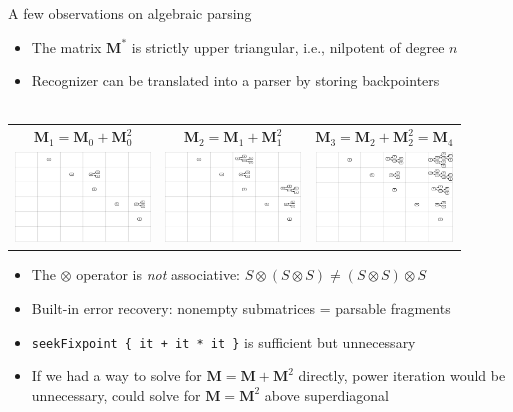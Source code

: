 \documentclass{beamer}
\begin{document}
\begin{frame}{A few observations on algebraic parsing}
  \begin{itemize}
    \item The matrix $\mathbf M^*$ is strictly upper triangular, i.e., nilpotent of degree $n$
    \item Recognizer can be translated into a parser by storing backpointers\\\\
  \end{itemize}\vspace{0.2cm}
  \begin{tabular}{ c c c }
    \small{$\mathbf{M}_1 = \mathbf{M}_0 + \mathbf{M}_0^2$} & \small{$\mathbf{M}_2 = \mathbf{M}_1 + \mathbf{M}_1^2$} & \small{$\mathbf{M}_3 = \mathbf{M}_2 + \mathbf{M}_2^2 = \mathbf{M}_4$} \\
    \includegraphics[trim=420 288 0 0,clip, width=3.6cm]{../figures/parse2.png} &
    \includegraphics[trim=420 285 0 0,clip, width=3.6cm]{../figures/parse3.png} &
    \includegraphics[trim=420 287 0 0,clip, width=3.63cm]{../figures/parse4.png}
  \end{tabular}
  \begin{itemize}
    \item The $\otimes$ operator is \textit{not} associative: $S \otimes (S \otimes S) \neq (S \otimes S) \otimes S$
    \item Built-in error recovery: nonempty submatrices = parsable fragments
    \item \texttt{seekFixpoint \{ it + it * it \}} is sufficient but unnecessary
    \item If we had a way to solve for $\mathbf{M = M + M}^2$ directly, power iteration would be unnecessary, could solve for $\mathbf{M = M}^2$ above superdiagonal
  \end{itemize}
\end{frame}
\end{document}
